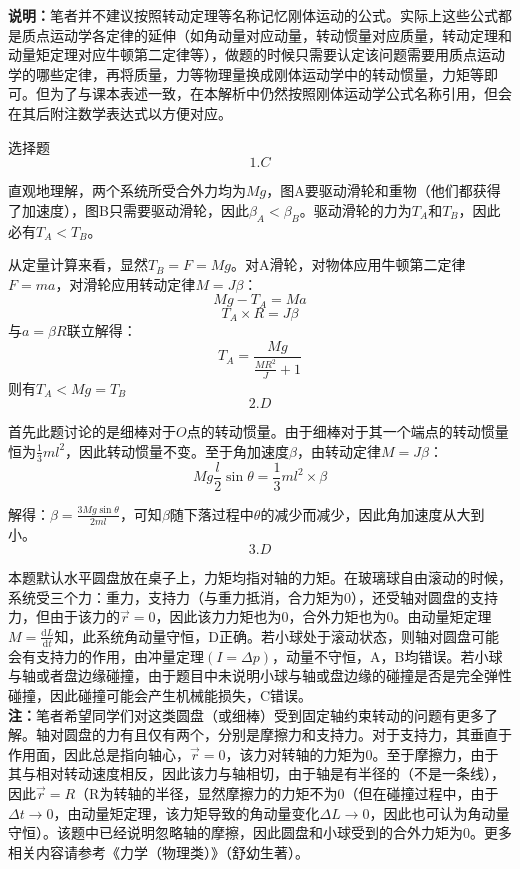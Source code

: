 \documentclass[a4paper,fleqn,twocolumn]{ctexart}
\newcommand{\di}[1]{\mathrm{d}#1}
\newcommand{\dy}[2]{\frac{\di{#1}}{\di{#2}}}
\begin{document}
	\noindent\textbf{\Large 说明：}笔者并不建议按照转动定理等名称记忆刚体运动的公式。实际上这些公式都是质点运动学各定律的延伸（如角动量对应动量，转动惯量对应质量，转动定理和动量矩定理对应牛顿第二定律等），做题的时候只需要认定该问题需要用质点运动学的哪些定律，再将质量，力等物理量换成刚体运动学中的转动惯量，力矩等即可。但为了与课本表述一致，在本解析中仍然按照刚体运动学公式名称引用，但会在其后附注数学表达式以方便对应。
	\begin{section}{选择题}
		\[1.C\]\par
		直观地理解，两个系统所受合外力均为$ Mg $，图A要驱动滑轮和重物（他们都获得了加速度），图B只需要驱动滑轮，因此$ \beta_A<\beta_B $。驱动滑轮的力为$ T_A $和$ T_B $，因此必有$ T_A<T_B $。\par
		从定量计算来看，显然$ T_B=F=Mg $。对A滑轮，对物体应用牛顿第二定律$F=ma$，对滑轮应用转动定律$M=J\beta$：
		\[Mg-T_A=Ma\]
		\[T_A\times R=J\beta\]
		与$ a=\beta R $联立解得：
		\[T_A=\frac{Mg}{\frac{MR^2}{J}+1}\]
		则有$ T_A< Mg=T_B$
		\[2.D\]\par
		\par
		首先此题讨论的是细棒对于$ O $点的转动惯量。由于细棒对于其一个端点的转动惯量恒为$ \frac{1}{3}ml^2 $，因此转动惯量不变。至于角加速度$ \beta $，由转动定律$M=J\beta$：
			\[Mg\frac{l}{2}\sin\theta=\frac{1}{3}ml^2\times\beta\]\par
		解得：$ \beta=\frac{3Mg\sin\theta}{2ml} $，可知$ \beta $随下落过程中$ \theta $的减少而减少，因此角加速度从大到小。
		\[3.D\]\par
		本题默认水平圆盘放在桌子上，力矩均指对轴的力矩。在玻璃球自由滚动的时候，系统受三个力：重力，支持力（与重力抵消，合力矩为0），还受轴对圆盘的支持力，但由于该力的$ \vec{r}=0 $，因此该力力矩也为0，合外力矩也为0。由动量矩定理$ M=\dy{L}{t} $知，此系统角动量守恒，D正确。若小球处于滚动状态，则轴对圆盘可能会有支持力的作用，由冲量定理$ (I=\Delta p) $，动量不守恒，A，B均错误。若小球与轴或者盘边缘碰撞，由于题目中未说明小球与轴或盘边缘的碰撞是否是完全弹性碰撞，因此碰撞可能会产生机械能损失，C错误。\\
		\textbf{\Large 注：}笔者希望同学们对这类圆盘（或细棒）受到固定轴约束转动的问题有更多了解。轴对圆盘的力有且仅有两个，分别是摩擦力和支持力。对于支持力，其垂直于作用面，因此总是指向轴心，$ \vec{r}=0 $，该力对转轴的力矩为0。至于摩擦力，由于其与相对转动速度相反，因此该力与轴相切，由于轴是有半径的（不是一条线），因此$ \vec{r}=R $（R为转轴的半径，显然摩擦力的力矩不为0（但在碰撞过程中，由于$ \Delta t\to 0 $，由动量矩定理，该力矩导致的角动量变化$ \Delta L\to 0 $，因此也可认为角动量守恒）。该题中已经说明忽略轴的摩擦，因此圆盘和小球受到的合外力矩为0。更多相关内容请参考《力学（物理类）》（舒幼生著）。

\end{section}
\end{document}
